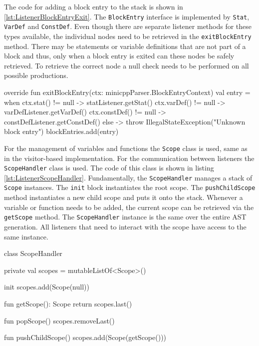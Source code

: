 The code for adding a block entry to the stack is shown in \ref{lst:ListenerBlockEntryExit}. The \verb|BlockEntry| interface is implemented by \verb|Stat|, \verb|VarDef| and \verb|ConstDef|. Even though there are separate listener methods for these types available, the individual nodes need to be retrieved in the \verb|exitBlockEntry| method. There may be statements or variable definitions that are not part of a block and thus, only when a block entry is exited can these nodes be safely retrieved. To retrieve the correct node a null check needs to be performed on all possible productions. 


\begin{KotlinCode}[float,numbers=none,caption=Implementation of the \texttt{exitBlockEntry} method., label=lst:ListenerBlockEntryExit]
    override fun exitBlockEntry(ctx: minicppParser.BlockEntryContext) {
        val entry = when {
            ctx.stat() != null -> statListener.getStat()
            ctx.varDef() != null -> varDefListener.getVarDef()
            ctx.constDef() != null -> constDefListener.getConstDef()
            else -> throw IllegalStateException("Unknown block entry")
        }
        blockEntries.add(entry)
    }
\end{KotlinCode}

For the management of variables and functions the \verb|Scope| class is used, same as in the visitor-based implementation. For the communication between listeners the \verb|ScopeHandler| class is used. The code of this class is shown in listing \ref{lst:ListenerScopeHandler}. Fundamentally, the \verb|ScopeHandler| manages a stack of \verb|Scope| instances. The \verb|init| block instantiates the root scope. The \verb|pushChildScope| method instantiates a new child scope and puts it onto the stack. Whenever a variable or function needs to be added, the current scope can be retrieved via the \verb|getScope| method. The \verb|ScopeHandler| instance is the same over the entire AST generation. All listeners that need to interact with the scope have access to the same instance. 


\begin{KotlinCode}[float,numbers=none,caption=Implementation of the \texttt{ScopeHandler} class., label=lst:ListenerScopeHandler]
class ScopeHandler {

    private val scopes = mutableListOf<Scope>()

    init {
        scopes.add(Scope(null))
    }

    fun getScope(): Scope {
        return scopes.last()
    }

    fun popScope() {
        scopes.removeLast()
    }

    fun pushChildScope() {
        scopes.add(Scope(getScope()))
    }
}
\end{KotlinCode}

